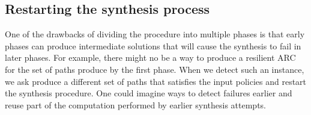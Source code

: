 \subsection{Restarting the synthesis process}
One of the drawbacks of dividing the procedure into multiple phases is that
early phases can produce intermediate solutions that will cause the synthesis to fail in  later phases. 
For example, there might no be a way to produce a resilient ARC for  the set of paths produce by the first phase. 
When we detect such an instance, we ask produce a different set of paths that satisfies the input policies
and restart the synthesis procedure.
One could imagine ways to detect failures earlier and reuse part of the computation performed by earlier synthesis
attempts. %
